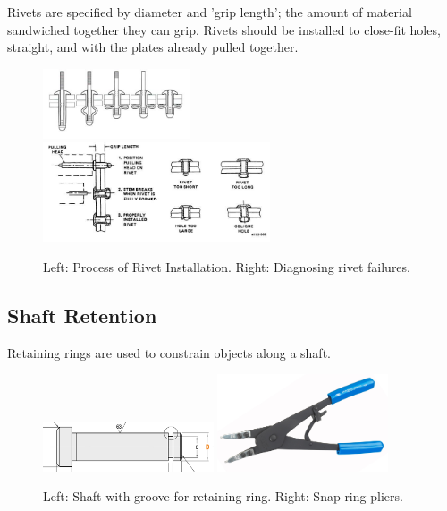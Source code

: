 \documentclass[10pt,letterpaper]{book}
\begin{document}
	Rivets are specified by diameter and 'grip length'; the amount of material sandwiched together they can grip. Rivets should be installed to close-fit holes, straight, and with the plates already pulled together.
	
	\begin{figure}[H] \centering
		\includegraphics[width=0.39\textwidth]{imgs/rivet_proc.jpeg}
		\includegraphics[width=0.6\textwidth]{imgs/rivet_install.jpeg}
		\caption{Left: Process of Rivet Installation. Right: Diagnosing rivet failures.}
	\end{figure}
	
	
	\subsection{Shaft Retention}
	
	Retaining rings are used to constrain objects along a shaft.
	
	\begin{figure}[H]
		\centering
		\includegraphics[width=0.45\textwidth]{imgs/shaft_snapringgroove.png}
		\includegraphics[width=0.45\textwidth]{imgs/snapringtool.jpeg}
		\caption{Left: Shaft with groove for retaining ring. Right: Snap ring pliers.}
	\end{figure}
	
\end{document}
